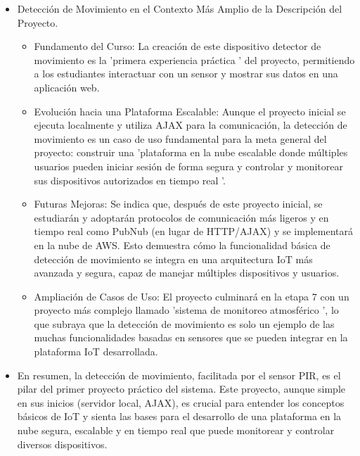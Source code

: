 \documentclass{report}
\begin{document}
\begin{itemize}
    \item Detección de Movimiento en el Contexto Más Amplio de la Descripción del Proyecto.
    \begin{itemize}
        \item Fundamento del Curso: La creación de este dispositivo detector de movimiento es la 'primera experiencia práctica ' del proyecto, permitiendo a los estudiantes 
        interactuar con un sensor y mostrar sus datos en una aplicación web.
        \item Evolución hacia una Plataforma Escalable: Aunque el proyecto inicial se ejecuta localmente y utiliza AJAX para la comunicación, la detección de 
        movimiento es un caso de uso fundamental para la meta general del proyecto: construir una  'plataforma en la nube escalable donde múltiples usuarios 
        pueden iniciar sesión de forma segura y controlar y monitorear sus dispositivos autorizados en tiempo real '.
        \item Futuras Mejoras: Se indica que, después de este proyecto inicial, se estudiarán y adoptarán protocolos de comunicación más ligeros y en 
        tiempo real como PubNub (en lugar de HTTP/AJAX) y se implementará en la nube de AWS. Esto demuestra cómo la funcionalidad básica de detección de 
        movimiento se integra en una arquitectura IoT más avanzada y segura, capaz de manejar múltiples dispositivos y usuarios.
        \item Ampliación de Casos de Uso: El proyecto culminará en la etapa 7 con un proyecto más complejo llamado  'sistema de monitoreo atmosférico ', lo que 
        subraya que la detección de movimiento es solo un ejemplo de las muchas funcionalidades basadas en sensores que se pueden integrar en la plataforma IoT 
        desarrollada.
    \end{itemize}

    \item En resumen, la detección de movimiento, facilitada por el sensor PIR, es el pilar del primer proyecto práctico 
    del sistema. Este proyecto, aunque simple en sus inicios (servidor local, AJAX), es crucial para entender los conceptos 
    básicos de IoT y sienta las bases para el desarrollo de una plataforma en la nube segura, escalable y en tiempo real que 
    puede monitorear y controlar diversos dispositivos.
\end{itemize}
\end{document}
